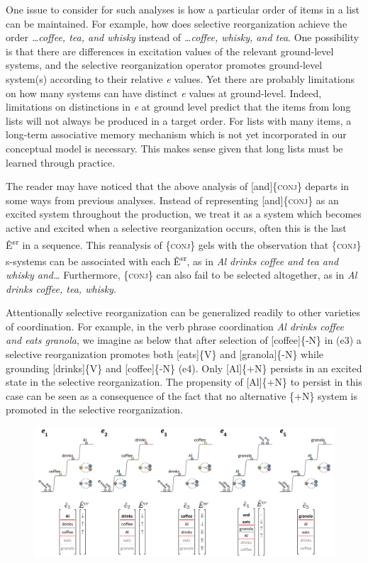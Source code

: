   One issue to consider for such analyses is how a particular order of items in a list can be maintained. For example, how does selective reorganization achieve the order \textit{…coffee, tea, and whisky} instead of \textit{…coffee, whisky, and tea}. One possibility is that there are differences in excitation values of the relevant ground-level systems, and the selective reorganization operator promotes ground-level system(s) according to their relative \textit{e} values. Yet there are probably limitations on how many systems can have distinct \textit{e} values at ground-level. Indeed, limitations on distinctions in \textit{e} at ground level predict that the items from long lists will not always be produced in a target order. For lists with many items, a long-term associative memory mechanism which is not yet incorporated in our conceptual model is necessary. This makes sense given that long lists must be learned through practice.

  The reader may have noticed that the above analysis of [and]\{\textsc{conj}\} departs in some ways from previous analyses. Instead of representing [and]\{\textsc{conj}\} as an excited system throughout the production, we treat it as a system which becomes active and excited when a selective reorganization occurs, often this is the last Ê\textsuperscript{sr} in a sequence. This reanalysis of \{\textsc{conj}\} gels with the observation that \{\textsc{conj}\} s-systems can be associated with each Ê\textsuperscript{sr}, as in \textit{Al drinks coffee and tea and whisky and…} Furthermore, \{\textsc{conj}\} can also fail to be selected altogether, as in \textit{Al drinks coffee, tea, whisky}.

  Attentionally selective reorganization can be generalized readily to other varieties of coordination. For example, in the verb phrase coordination \textit{Al drinks coffee and eats granola}, we imagine as below that after selection of [coffee]\{-N\} in (e3) a selective reorganization promotes both [eats]\{V\} and [granola]\{-N\} while grounding [drinks]\{V\} and [coffee]\{-N\} (e4). Only [Al]\{+N\} persists in an excited state in the selective reorganization. The propensity of [Al]\{+N\} to persist in this case can be seen as a consequence of the fact that no alternative \{+N\} system is promoted in the selective reorganization.

  
\begin{figure}
\includegraphics[width=\textwidth]{figures/Tilsen-img100.png}
\caption{\missingcaption}
\label{fig:4:50}
\end{figure}
 

